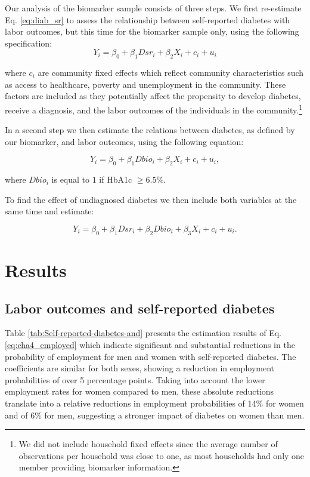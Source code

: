 \documentclass[12pt,english]{article}
\begin{document}
Our analysis of the biomarker sample consists of three steps. We first re-estimate Eq. \ref{eq:diab_sr} to assess the relationship between self-reported diabetes with labor outcomes, but this time for the biomarker sample only, using the following specification:
\begin{equation}
Y_{i}=\beta_{0}+\beta_{1}Dsr_{i}+\beta_{2}X_{i}+c_{i}+u_{i}\label{eq:diab_sr}
\end{equation}

where $c_{i}$ are community fixed effects which reflect community characteristics such as access to healthcare, poverty and unemployment in the community. These factors are included as they potentially affect the propensity to develop diabetes, receive a diagnosis, and the labor outcomes of the individuals in the community.\footnote{We did not include household fixed effects since the average number of observations per household was close to one, as most households had only one member providing biomarker information.}

In a second step we then estimate the relations between diabetes, as defined by our biomarker, and labor outcomes, using the following equation:

\begin{equation}
Y_{i}=\beta_{0}+\beta_{1}Dbio_{i}+\beta_{2}X_{i}+c_{i}+u_{i}\label{eq:diab},
\end{equation}

where $Dbio_{i}$ is equal to $1$ if \ac{HbA1c} $\geq6.5\%$. 

To find the effect of undiagnosed diabetes we then include both variables at the same time and estimate:

\begin{equation}
Y_{i}=\beta_{0}+\beta_{1}Dsr_{i}+\beta_{2}Dbio_{i}+\beta_{3}X_{i}+c_{i}+u_{i}.\label{eq:diab_ud}
\end{equation}


\section{\label{sec:cha_4_results}Results}


\subsection{Labor outcomes and self-reported diabetes}

Table \ref{tab:Self-reported-diabetes-and} presents the estimation results of Eq. \ref{eq:cha4_employed} which indicate significant and substantial reductions in the probability of employment for men and women with self-reported diabetes. The coefficients are similar for both sexes, showing a reduction in employment probabilities of over 5 percentage points. Taking into account the lower employment rates for women compared to men, these absolute reductions translate into a relative reductions in employment probabilities of 14\% for women and of 6\% for men, suggesting a stronger impact of diabetes on women than men.
\end{document}
